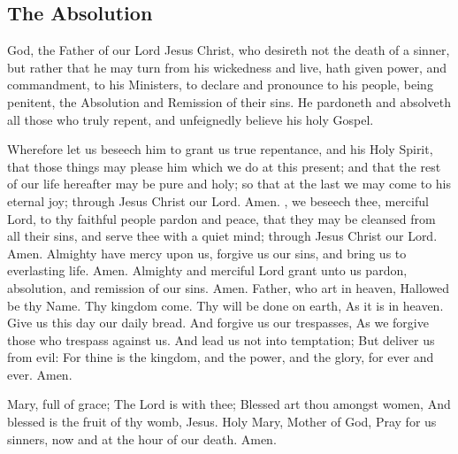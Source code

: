 \subsection{The Absolution}
 God, the Father of our Lord Jesus Christ, who desireth not the death of a sinner, but rather that he may turn from his wickedness and live, hath given power, and commandment, to his Ministers, to declare and pronounce to his people, being penitent, the Absolution and Remission of their sins. He pardoneth and {} absolveth all those who truly repent, and unfeignedly believe his holy Gospel.
\par
Wherefore let us beseech him to grant us true repentance, and his Holy Spirit, that those things may please him which we do at this present; and that the rest of our life hereafter may be pure and holy; so that at the last we may come to his eternal joy; through Jesus Christ our Lord. Amen.
, we beseech thee, merciful Lord, to thy faithful people pardon and peace, that they may be cleansed from all their sins, and serve thee with a quiet mind; through Jesus Christ our Lord. Amen.
 Almighty have mercy upon us, forgive us our sins, and bring us to everlasting life. Amen.
 Almighty and merciful Lord grant unto us pardon, absolution, and remission of our sins. Amen.
 Father, who art in heaven, Hallowed be thy Name. Thy kingdom come. Thy will be done on earth, As it is in heaven. Give us this day our daily bread. And forgive us our trespasses, As we forgive those who trespass against us. And lead us not into temptation; But deliver us from evil: For thine is the kingdom, and the power, and the glory, for ever and ever. Amen.
\par\noindent
{} Mary, full of grace; The Lord is with thee; Blessed art thou amongst women, And blessed is the fruit of thy womb, Jesus. Holy Mary, Mother of God, Pray for us sinners, now and at the hour of our death. Amen.